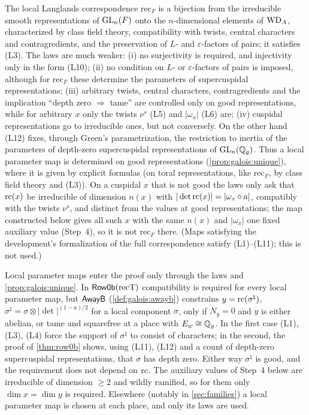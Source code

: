 \begin{remark}\label{rem:galois:llc}
The local Langlands correspondence $\mathrm{rec}_F$ \cite{HarrisTaylor2001,Henniart2000,Scholze2013} is
a bijection from the irreducible smooth representations of $\operatorname{GL}_n(F)$ onto the $n$-dimensional
elements of $\mathrm{WD}_A$, characterized \cite{Henniart1993} by class field theory, compatibility with
twists, central characters and contragredients, and the preservation of $L$- and $\varepsilon$-factors
of pairs; it satisfies (L3). The laws are much weaker: (i) no surjectivity is required, and
injectivity only in the form (L10); (ii) no condition on $L$- or $\varepsilon$-factors of pairs is
imposed, although for $\mathrm{rec}_F$ these determine the parameters of supercuspidal
representations; (iii) arbitrary twists, central characters, contragredients and the implication
``depth zero $\Rightarrow$ tame'' are controlled only on good representations, while for arbitrary $x$
only the twists $\nu^s$ (L5) and $|\omega_x|$ (L6) are; (iv) cuspidal representations go to irreducible
ones, but not conversely. On
the other hand (L12) fixes, through Green's parametrization, the restriction to inertia of the
parameters of depth-zero supercuspidal representations of $\operatorname{GL}_n(\mathbb{Q}_g)$. Thus a local parameter map is
determined on good representations (\cref{prop:galois:unique}), where it is given by explicit formulas
(on toral representations, like $\mathrm{rec}_F$, by class field theory and (L3)). On a cuspidal $x$ that
is not good the laws only ask that $\mathrm{rc}(x)$ be irreducible of dimension $n(x)$ with
$|\det\mathrm{rc}(x)|=|\omega_x\circ a|$, compatibly with the twists $\nu^s$, and distinct from the values
at good representations; the map constructed below gives all such $x$ with the same $n(x)$ and
$|\omega_x|$ one fixed auxiliary value (Step~4), so it is not $\mathrm{rec}_F$ there. (Maps satisfying
the development's formalization of the full correspondence satisfy (L1)--(L11); this is not used.)
\end{remark}

\begin{remark}\label{rem:galois:suffices}
Local parameter maps enter the proof only through the laws and \cref{prop:galois:unique}. In
$\mathsf{Row0b}(\mathrm{recT})$ compatibility is required for every local parameter map, but
$\mathsf{AwayB}$ (\cref{def:galois:awayb}) constrains $y=\mathrm{rc}(\sigma^\natural)$, $\sigma^\natural=
\sigma\otimes|\det|^{(1-a)/2}$ for a local component $\sigma$, only if $N_y=0$ and $y$ is either
abelian, or tame and squarefree at a place with $E_w\cong\mathbb{Q}_g$. In the first case (L1), (L3), (L4)
force the support of $\sigma^\natural$ to consist of characters; in the second, the proof of
\cref{thm:row0b} shows, using (L11), (L12) and a count of depth-zero supercuspidal representations,
that $\sigma$ has depth zero. Either way $\sigma^\natural$ is good, and the requirement does not depend
on $\mathrm{rc}$. The auxiliary values of Step~4 below are irreducible of dimension $\ge2$ and wildly
ramified, so for them only $\dim x=\dim y$ is required. Elsewhere (notably in \cref{sec:families}) a
local parameter map is chosen at each place, and only its laws are used.
\end{remark}

